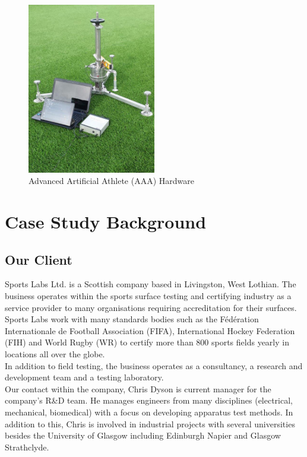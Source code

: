 \documentclass{l3proj}
\begin{document}
\begin{figure}[h]
\label{fig:AAA}
\caption{Advanced Artificial Athlete (AAA) Hardware \cite{sportstestequip} }
\centering
\includegraphics[width=0.5\textwidth]{./images/AAA+3.png}
\end{figure}

\section{Case Study Background}
\subsection{Our Client}
Sports Labs Ltd. is a Scottish company based in Livingston, West Lothian. The business operates within the sports surface testing and certifying industry as a service provider to many organisations requiring accreditation for their surfaces. Sports Labs work with many standards bodies such as the Fédération Internationale de Football Association (FIFA), International Hockey Federation (FIH) and World Rugby (WR) to certify more than 800 sports fields yearly in locations all over the globe. \\
In addition to field testing, the business  operates as a consultancy, a research and development team and a testing laboratory.\\
Our contact within the company, Chris Dyson is current manager for the company's R\&D team. He manages engineers from many disciplines (electrical, mechanical, biomedical) with a focus on developing apparatus test methods. In addition to this, Chris is involved in industrial projects with several universities besides the University of Glasgow including Edinburgh Napier and Glasgow Strathclyde.  
\end{document}
